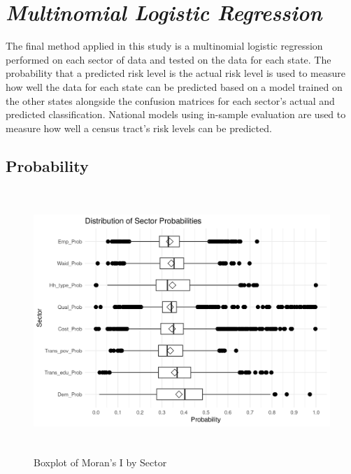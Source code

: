 \section{\textit{Multinomial Logistic Regression}}

The final method applied in this study is a multinomial logistic regression performed on each sector of data and tested on the data for each state. The probability that a predicted risk level is the actual risk level is used to measure how well the data for each state can be predicted based on a model trained on the other states alongside the confusion matrices for each sector's actual and predicted classification. National models using in-sample evaluation are used to measure how well a census tract's risk levels can be predicted.

\subsection{Probability}

\begin{figure}[htbp]
    \centering
     \includegraphics[width=1\textwidth, height=10cm]{plots/prob_sector.png}
     \caption{Boxplot of Moran's I by Sector}
     \label{fig:prob_sector}
 \end{figure}

